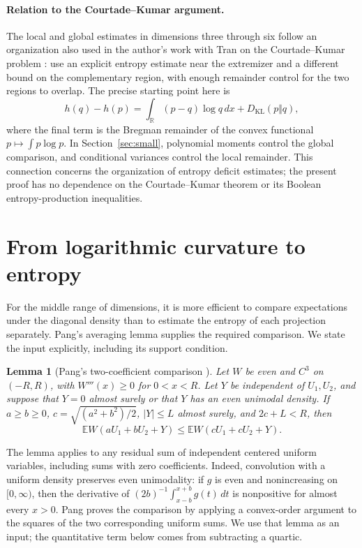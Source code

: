 \documentclass[11pt,a4paper]{article}
\newtheorem{lemma}[theorem]{Lemma}
\theoremstyle{remark}\newtheorem{remark}[theorem]{Remark}
\newcommand{\E}{\mathbb E}
\newcommand{\KL}{D_{\mathrm{KL}}}
\begin{document}
\paragraph{Relation to the Courtade--Kumar argument.}
The local and global estimates in dimensions three through six follow
an organization also used in the author's work with Tran on the
Courtade--Kumar problem \cite[Sections~1.1 and~8]{KyTran2026}: use an
explicit entropy estimate near the extremizer and a different bound on
the complementary region, with enough remainder control for the two
regions to overlap. The precise starting point here is
\[
 h(q)-h(p)=\int_{\mathbb R}(p-q)\log q\,dx+\KL(p\Vert q),
\]
where the final term is the Bregman remainder of the convex functional
$p\mapsto\int p\log p$. In Section~\ref{sec:small}, polynomial moments
control the global comparison, and conditional variances control the
local remainder. This connection concerns the organization of entropy
deficit estimates; the present proof has no dependence on the
Courtade--Kumar theorem or its Boolean entropy-production inequalities.

\section{From logarithmic curvature to entropy}\label{sec:curvature-comparison}
For the middle range of dimensions, it is more efficient to compare
expectations under the diagonal density than to estimate the entropy of
each projection separately. Pang's averaging lemma supplies the required
comparison. We state the input explicitly, including its support condition.

\begin{lemma}[Pang's two-coefficient comparison {\cite[Lemma~2.1]{Pang}}]
\label{lem:pang-pair}
Let $W$ be even and $C^3$ on $(-R,R)$, with $W'''(x)\ge0$ for
$0<x<R$. Let $Y$ be independent of $U_1,U_2$, and suppose that $Y=0$
almost surely or that $Y$ has an even unimodal density. If $a\ge b\ge0$,
$c=\sqrt{(a^2+b^2)/2}$, $|Y|\le L$ almost surely, and $2c+L<R$, then
\[
 \E W(aU_1+bU_2+Y)\le\E W(cU_1+cU_2+Y).
\]
\end{lemma}

The lemma applies to any residual sum of independent centered uniform
variables, including sums with zero coefficients. Indeed, convolution
with a uniform density preserves even unimodality: if $g$ is even and
nonincreasing on $[0,\infty)$, then the derivative of
$(2b)^{-1}\int_{x-b}^{x+b}g(t)\,dt$ is nonpositive for almost every $x>0$.
Pang proves the comparison by applying a convex-order argument to the
squares of the two corresponding uniform sums. We use that lemma as an
input; the quantitative term below comes from subtracting a quartic.
\end{document}
